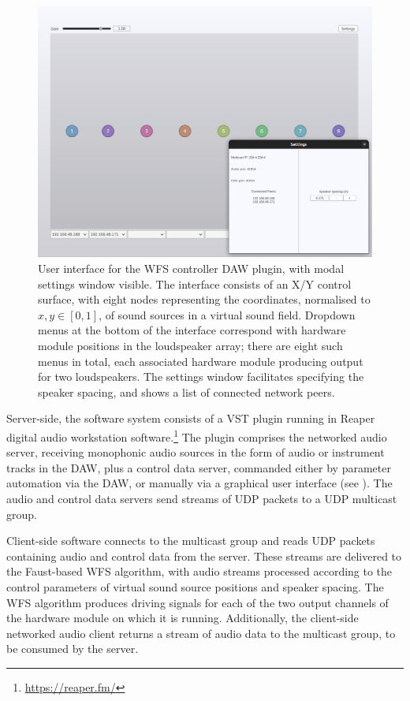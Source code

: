 \begin{figure}[ht]
    \centering
    \includegraphics[width=\textwidth]{figures/plugin}
    \caption{
        User interface for the WFS controller DAW plugin, with modal
        settings window visible.
        The interface consists of an X/Y control surface, with eight nodes
        representing the coordinates, normalised to $x,y \in [0,1]$, of sound
        sources in a virtual sound field.
        Dropdown menus at the bottom of the interface correspond with hardware
        module positions in the loudspeaker array; there are eight such menus
        in total, each associated hardware module producing output for two
        loudspeakers.
        The settings window facilitates specifying the speaker spacing, and
        shows a list of connected network peers.
    }
    \label{fig:plugin-interface}
\end{figure}

Server-side, the software system consists of a VST plugin running in Reaper
digital audio workstation software.\footnote{\url{https://reaper.fm/}}
The plugin comprises the networked audio server, receiving monophonic audio
sources in the form of audio or instrument tracks in the DAW, plus a control
data server, commanded either by parameter automation via the DAW, or manually
via a graphical user interface (see ).
The audio and control data servers send streams of UDP packets to a UDP
multicast group.

Client-side software connects to the multicast group and reads UDP packets
containing audio and control data from the server.
These streams are delivered to the Faust-based WFS algorithm, with audio
streams processed according to the control parameters of virtual sound source
positions and speaker spacing.
The WFS algorithm produces driving signals for each of the two output channels
of the hardware module on which it is running.
Additionally, the client-side networked audio client returns a stream of audio
data to the multicast group, to be consumed by the server.


